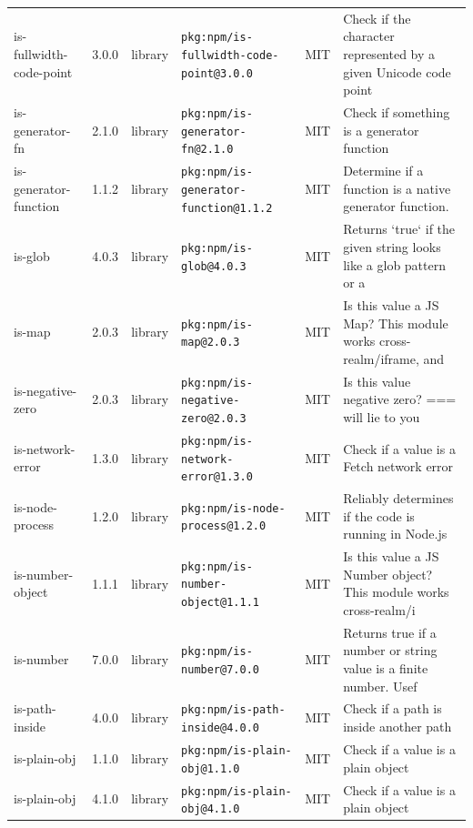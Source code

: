 \documentclass[11pt,a4paper]{article}
\begin{document}
\begin{longtable}{|p{4cm}|p{2cm}|p{1.6cm}|p{5cm}|p{1.5cm}|p{3.5cm}|}
\raggedright is-fullwidth-code-point & 3.0.0 & library & \small\texttt{pkg:npm/is-fullwidth-code-point@3.0.0} & MIT & \small Check if the character represented by a given Unicode code point  \\
\raggedright is-generator-fn & 2.1.0 & library & \small\texttt{pkg:npm/is-generator-fn@2.1.0} & MIT & \small Check if something is a generator function \\
\raggedright is-generator-function & 1.1.2 & library & \small\texttt{pkg:npm/is-generator-function@1.1.2} & MIT & \small Determine if a function is a native generator function. \\
\raggedright is-glob & 4.0.3 & library & \small\texttt{pkg:npm/is-glob@4.0.3} & MIT & \small Returns `true` if the given string looks like a glob pattern or a \\
\raggedright is-map & 2.0.3 & library & \small\texttt{pkg:npm/is-map@2.0.3} & MIT & \small Is this value a JS Map? This module works cross-realm/iframe, and \\
\raggedright is-negative-zero & 2.0.3 & library & \small\texttt{pkg:npm/is-negative-zero@2.0.3} & MIT & \small Is this value negative zero? === will lie to you \\
\raggedright is-network-error & 1.3.0 & library & \small\texttt{pkg:npm/is-network-error@1.3.0} & MIT & \small Check if a value is a Fetch network error \\
\raggedright is-node-process & 1.2.0 & library & \small\texttt{pkg:npm/is-node-process@1.2.0} & MIT & \small Reliably determines if the code is running in Node.js \\
\raggedright is-number-object & 1.1.1 & library & \small\texttt{pkg:npm/is-number-object@1.1.1} & MIT & \small Is this value a JS Number object? This module works cross-realm/i \\
\raggedright is-number & 7.0.0 & library & \small\texttt{pkg:npm/is-number@7.0.0} & MIT & \small Returns true if a number or string value is a finite number. Usef \\
\raggedright is-path-inside & 4.0.0 & library & \small\texttt{pkg:npm/is-path-inside@4.0.0} & MIT & \small Check if a path is inside another path \\
\raggedright is-plain-obj & 1.1.0 & library & \small\texttt{pkg:npm/is-plain-obj@1.1.0} & MIT & \small Check if a value is a plain object \\
\raggedright is-plain-obj & 4.1.0 & library & \small\texttt{pkg:npm/is-plain-obj@4.1.0} & MIT & \small Check if a value is a plain object \\

\end{longtable}
\end{document}
